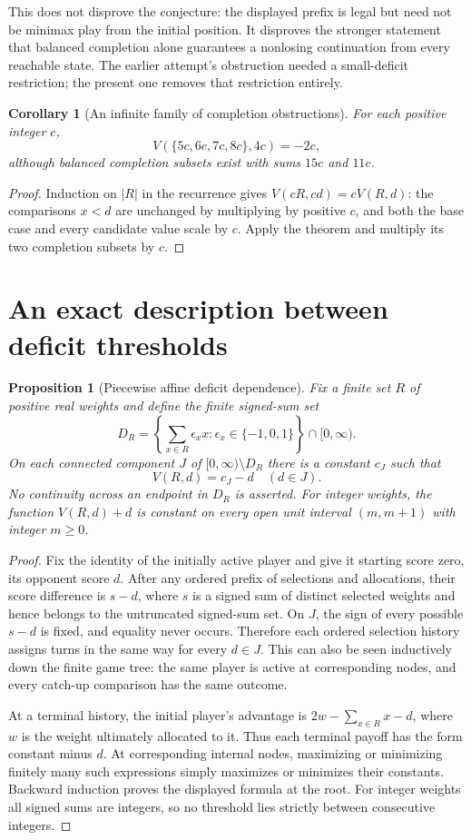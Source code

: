 \documentclass[11pt]{article}
\newtheorem{proposition}[theorem]{Proposition}
\newtheorem{corollary}[theorem]{Corollary}
\theoremstyle{definition}
\begin{document}
This does not disprove the conjecture: the displayed prefix is legal but need not be minimax play from the initial position. It disproves the stronger statement that balanced completion alone guarantees a nonlosing continuation from every reachable state. The earlier attempt's obstruction needed a small-deficit restriction; the present one removes that restriction entirely.

\begin{corollary}[An infinite family of completion obstructions]
For each positive integer $c$,
\[
 V(\{5c,6c,7c,8c\},4c)=-2c,
\]
although balanced completion subsets exist with sums $15c$ and $11c$.
\end{corollary}
\begin{proof}
Induction on $|R|$ in the recurrence gives $V(cR,cd)=cV(R,d)$: the comparisons $x<d$ are unchanged by multiplying by positive $c$, and both the base case and every candidate value scale by $c$. Apply the theorem and multiply its two completion subsets by $c$.
\end{proof}

\section*{An exact description between deficit thresholds}
\begin{proposition}[Piecewise affine deficit dependence]
Fix a finite set $R$ of positive real weights and define the finite signed-sum set
\[
 D_R=\left\{\sum_{x\in R}\epsilon_x x:\epsilon_x\in\{-1,0,1\}\right\}\cap[0,\infty).
\]
On each connected component $J$ of $[0,\infty)\setminus D_R$ there is a constant $c_J$ such that
\[
 V(R,d)=c_J-d\quad(d\in J).
\]
No continuity across an endpoint in $D_R$ is asserted. For integer weights, the function $V(R,d)+d$ is constant on every open unit interval $(m,m+1)$ with integer $m\ge0$.
\end{proposition}
\begin{proof}
Fix the identity of the initially active player and give it starting score zero, its opponent score $d$. After any ordered prefix of selections and allocations, their score difference is $s-d$, where $s$ is a signed sum of distinct selected weights and hence belongs to the untruncated signed-sum set. On $J$, the sign of every possible $s-d$ is fixed, and equality never occurs. Therefore each ordered selection history assigns turns in the same way for every $d\in J$. This can also be seen inductively down the finite game tree: the same player is active at corresponding nodes, and every catch-up comparison has the same outcome.

At a terminal history, the initial player's advantage is $2w-\sum_{x\in R}x-d$, where $w$ is the weight ultimately allocated to it. Thus each terminal payoff has the form constant minus $d$. At corresponding internal nodes, maximizing or minimizing finitely many such expressions simply maximizes or minimizes their constants. Backward induction proves the displayed formula at the root. For integer weights all signed sums are integers, so no threshold lies strictly between consecutive integers.
\end{proof}
\end{document}
